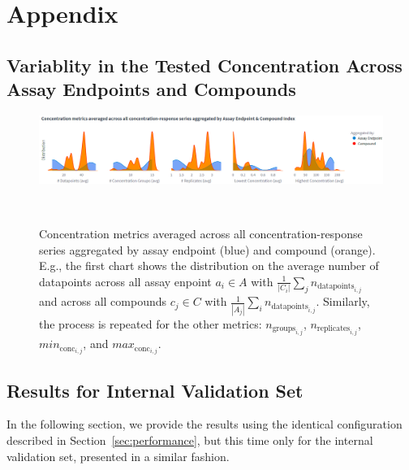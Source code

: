 \chapter{Appendix}\label{chap:appendix}
\section{Variablity in the Tested Concentration Across Assay Endpoints and Compounds}\label{sec:variability}
\begin{figure}[h]  %
    \centering
    \includegraphics[width=1.0\textwidth]{figures/concentration_metric_distributions.png}  
    \caption{Concentration metrics averaged across all concentration-response series aggregated by assay endpoint (blue) and compound (orange). E.g., the first chart shows the distribution on the average number of datapoints across all assay enpoint $a_i \in A$ with $\frac{1}{|C_i|} \sum_{j} n_{\text{datapoints}_{i,j}}$ and across all compounds $c_j \in C$ with $\frac{1}{|A_j|} \sum_{i} n_{\text{datapoints}_{i,j}}$. Similarly, the process is repeated for the other metrics: $n_{\text{groups}_{i,j}}$, $n_{\text{replicates}_{i,j}}$, $min_{\text{conc}_{i,j}}$, and $max_{\text{conc}_{i,j}}$.
    }
~\label{fig:concentration_metric_distributions} 
\end{figure}

\section{Results for Internal Validation Set}\label{sec:internal_validation_set}

In the following section, we provide the results using the identical configuration described in Section~\ref{sec:performance}, but this time only for the internal validation set, presented in a similar fashion.
\newpage

